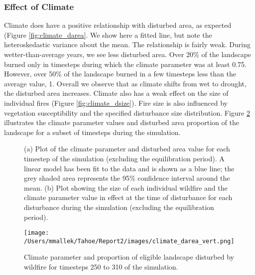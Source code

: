 \subsubsection{Effect of Climate} Climate does have a positive relationship with disturbed area, as expected (Figure \ref{fig:climate_darea}. We show here a fitted line, but note the heteroskedastic variance about the mean. The relationship is fairly weak. During wetter-than-average years, we see less disturbed area. Over 20\% of the landscape burned only in timesteps during which the climate parameter was at least 0.75. However, over 50\% of the landscape burned in a few timesteps less than the average value, 1. Overall we observe that as climate shifts from wet to drought, the disturbed area increases. Climate also has a weak effect on the size of individual fires (Figure \ref{fig:climate_dsize}). Fire size is also influenced by vegetation susceptibility and the specified disturbance size distribution. Figure \ref{fig:compare_clim_darea} illustrates the climate parameter values and disturbed area proportion of the landscape for a subset of timesteps during the simulation.
\begin{figure}[!htbp]
  \centering
  \caption{(a) Plot of the climate parameter and disturbed area value for each timestep of the simulation (excluding the  equilibration period). A linear model has been fit to the data and is shown as a blue line; the grey shaded area represents  the 95\% confidence interval around the mean. (b) Plot showing the size of each individual wildfire and the climate parameter value in effect at the time of disturbance for each disturbance during the simulation (excluding the equilibration period).}
  \label{fig:climate_disturbance}
\end{figure}

\begin{figure}[!htbp]
\centering
\texttt{[image: /Users/mmallek/Tahoe/Report2/images/climate\_darea\_vert.png]}
\caption{Climate parameter and proportion of eligible landscape disturbed by wildfire for timesteps 250 to 310 of the simulation.}
\label{fig:compare_clim_darea}
\end{figure}

